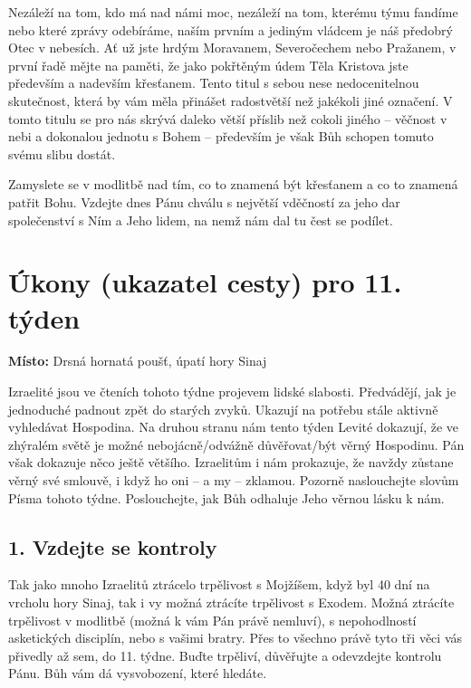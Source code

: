 \documentclass[11pt]{article}
\begin{document}
Nezáleží na tom, kdo má nad námi moc, nezáleží na tom, kterému týmu fandíme nebo které zprávy odebíráme, naším
prvním a jediným vládcem je náš předobrý Otec v nebesích. Ať už jste hrdým Moravanem, Severočechem nebo
Pražanem, v první řadě mějte na paměti, že jako pokřtěným údem Těla Kristova jste především a nadevším křesťanem.
Tento titul s sebou nese nedocenitelnou skutečnost, která by vám měla přinášet radostvětší než jakékoli jiné označení.
V tomto titulu se pro nás skrývá daleko větší příslib než cokoli jiného – věčnost v nebi a dokonalou jednotu s Bohem –
především je však Bůh schopen tomuto svému slibu dostát.

Zamyslete se v modlitbě nad tím, co to znamená být křesťanem a co to znamená patřit Bohu. Vzdejte dnes Pánu chválu
s největší vděčností za jeho dar společenství s Ním a Jeho lidem, na nemž nám dal tu čest se podílet.


\newpage
\section*{Úkony (ukazatel cesty) pro 11. týden}

\textbf{Místo:} Drsná hornatá poušť, úpatí hory Sinaj

Izraelité jsou ve čteních tohoto týdne projevem lidské slabosti. Předvádějí, jak je jednoduché padnout zpět do
starých zvyků. Ukazují na potřebu stále aktivně vyhledávat Hospodina. Na druhou stranu nám tento týden
Levité dokazují, že ve zhýralém světě je možné nebojácně/odvážně důvěřovat/být věrný Hospodinu. Pán
však dokazuje něco ještě většího. Izraelitům i nám prokazuje, že navždy zůstane věrný své smlouvě, i když
ho oni – a my – zklamou. Pozorně naslouchejte slovům Písma tohoto týdne. Poslouchejte, jak Bůh odhaluje
Jeho věrnou lásku k nám.

\subsection*{1. Vzdejte se kontroly}
Tak jako mnoho Izraelitů ztrácelo trpělivost s Mojžíšem, když byl 40 dní na vrcholu hory Sinaj, tak i vy možná ztrácíte trpělivost s Exodem. Možná ztrácíte trpělivost v modlitbě (možná k vám Pán právě nemluví), s nepohodlností asketických disciplín, nebo s vašimi bratry. Přes to všechno právě tyto tři věci vás přivedly až sem, do 11. týdne. Buďte trpěliví, důvěřujte a odevzdejte kontrolu Pánu. Bůh vám dá vysvobození, které hledáte.
\end{document}
